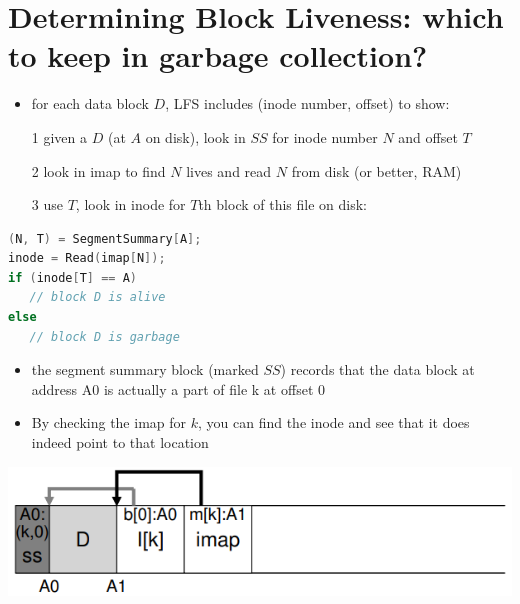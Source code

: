 \section*{Determining Block Liveness: which to keep in garbage collection?}
\begin{itemize}
\item for each data block $D$, LFS includes  (inode number, offset) to show:
\item[1] given a $D$ (at $A$ on disk), look in $SS$ for inode number $N$ and offset $T$
\item[2] look in imap to find $N$ lives and read $N$ from disk (or better, RAM)
\item[3] use $T$, look in inode for $T$th block of this file on disk:
\end{itemize}
\begin{minipage}{.45\linewidth}
\begin{lstlisting}[language=c]
(N, T) = SegmentSummary[A];
inode = Read(imap[N]);
if (inode[T] == A)
   // block D is alive
else
   // block D is garbage
\end{lstlisting}
\end{minipage}
\begin{minipage}{.55\linewidth}
  \flushleft
  \begin{itemize}
  \item the segment summary block (marked $SS$) records that the data block at address A0 is actually a part of file k at offset 0
  \item By checking the imap for $k$, you can find the inode and see that it does indeed point to that location
  \end{itemize}
\end{minipage}
\includegraphics[width=\linewidth]{imgs/lfs_liveness}

